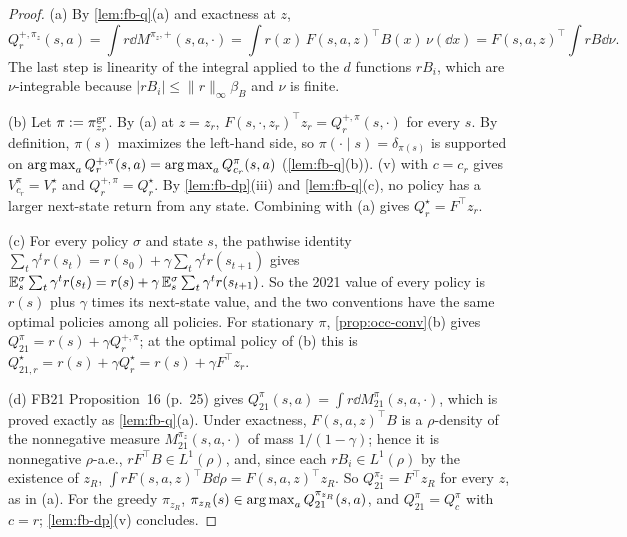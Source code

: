 \begin{proof}
(a) By \cref{lem:fb-q}(a) and exactness at $z$,
\[
Q^{+,\pi_z}_r(s,a)=\int r\dd M^{\pi_z,+}(s,a,\cdot)=\int r(x)\,F(s,a,z)^\top B(x)\,\nu(\dd x)=F(s,a,z)^\top\!\int rB\dd\nu .
\]
The last step is linearity of the integral applied to the $d$ functions $rB_i$, which are $\nu$-integrable because $|rB_i|\le\|r\|_\infty\beta_B$ and $\nu$ is finite.

(b) Let $\pi:=\pi^{\mathrm{gr}}_{z_r}$. By (a) at $z=z_r$, $F(s,\cdot,z_r)^\top z_r=Q^{+,\pi}_r(s,\cdot)$ for every $s$.
By definition, $\pi(s)$ maximizes the left-hand side, so $\pi(\cdot\mid s)=\delta_{\pi(s)}$ is supported on $\operatorname*{arg\,max}_aQ^{+,\pi}_r(s,a)=\operatorname*{arg\,max}_aQ^\pi_{c_r}(s,a)$ (\cref{lem:fb-q}(b)).
(v) with $c=c_r$ gives $V^\pi_{c_r}=V^\star_r$ and $Q^{+,\pi}_r=Q^\star_r$.
By \cref{lem:fb-dp}(iii) and \cref{lem:fb-q}(c), no policy has a larger next-state return from any state.
Combining with (a) gives $Q^\star_r=F^\top z_r$.

(c) For every policy $\sigma$ and state $s$, the pathwise identity $\sum_t\gamma^tr(s_t)=r(s_0)+\gamma\sum_t\gamma^tr(s_{t+1})$ gives $\mathbb{E}^\sigma_s\sum_t\gamma^tr(s_t)=r(s)+\gamma\,\mathbb{E}^\sigma_s\sum_t\gamma^tr(s_{t+1})$.
So the 2021 value of every policy is $r(s)$ plus $\gamma$ times its next-state value, and the two conventions have the same optimal policies among all policies.
For stationary $\pi$, \cref{prop:occ-conv}(b) gives $Q^\pi_{21}=r(s)+\gamma Q^{+,\pi}_r$; at the optimal policy of (b) this is $Q^\star_{21,r}=r(s)+\gamma Q^\star_r=r(s)+\gamma F^\top z_r$.

(d) FB21 Proposition~16 (p.~25) gives $Q^\pi_{21}(s,a)=\int r\dd M^\pi_{21}(s,a,\cdot)$, which is proved exactly as \cref{lem:fb-q}(a).
Under exactness, $F(s,a,z)^\top B$ is a $\rho$-density of the nonnegative measure $M^{\pi_z}_{21}(s,a,\cdot)$ of mass $1/(1-\gamma)$; hence it is nonnegative $\rho$-a.e., $rF^\top B\in L^1(\rho)$, and, since each $rB_i\in L^1(\rho)$ by the existence of $z_R$, $\int rF(s,a,z)^\top B\dd\rho=F(s,a,z)^\top z_R$.
So $Q^{\pi_z}_{21}=F^\top z_R$ for every $z$, as in (a).
For the greedy $\pi_{z_R}$, $\pi_{z_R}(s)\in\operatorname*{arg\,max}_aQ^{\pi_{z_R}}_{21}(s,a)$, and $Q^\pi_{21}=Q^\pi_c$ with $c=r$; \cref{lem:fb-dp}(v) concludes.
\end{proof}

